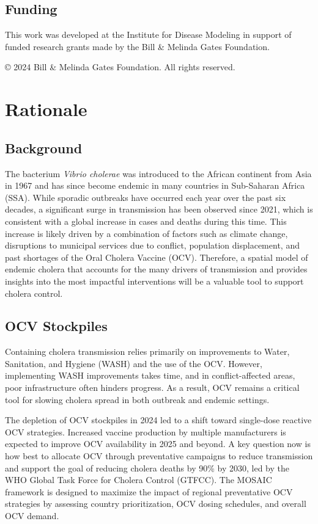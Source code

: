 \documentclass[
]{book}
\begin{document}
\section*{Funding}\label{funding}

This work was developed at the Institute for Disease Modeling in support of funded research grants made by the Bill \& Melinda Gates Foundation.

{
© 2024 Bill \& Melinda Gates Foundation. All rights reserved.
}

\chapter{Rationale}\label{rationale}

\section{Background}\label{background}

The bacterium \emph{Vibrio cholerae} was introduced to the African continent from Asia in 1967 and has since become endemic in many countries in Sub-Saharan Africa (SSA). While sporadic outbreaks have occurred each year over the past six decades, a significant surge in transmission has been observed since 2021, which is consistent with a global increase in cases and deaths during this time. This increase is likely driven by a combination of factors such as climate change, disruptions to municipal services due to conflict, population displacement, and past shortages of the Oral Cholera Vaccine (OCV). Therefore, a spatial model of endemic cholera that accounts for the many drivers of transmission and provides insights into the most impactful interventions will be a valuable tool to support cholera control.

\section{OCV Stockpiles}\label{ocv-stockpiles}

Containing cholera transmission relies primarily on improvements to Water, Sanitation, and Hygiene (WASH) and the use of the OCV. However, implementing WASH improvements takes time, and in conflict-affected areas, poor infrastructure often hinders progress. As a result, OCV remains a critical tool for slowing cholera spread in both outbreak and endemic settings.

The depletion of OCV stockpiles in 2024 led to a shift toward single-dose reactive OCV strategies. Increased vaccine production by multiple manufacturers is expected to improve OCV availability in 2025 and beyond. A key question now is how best to allocate OCV through preventative campaigns to reduce transmission and support the goal of reducing cholera deaths by 90\% by 2030, led by the WHO Global Task Force for Cholera Control (GTFCC). The MOSAIC framework is designed to maximize the impact of regional preventative OCV strategies by assessing country prioritization, OCV dosing schedules, and overall OCV demand.
\end{document}
